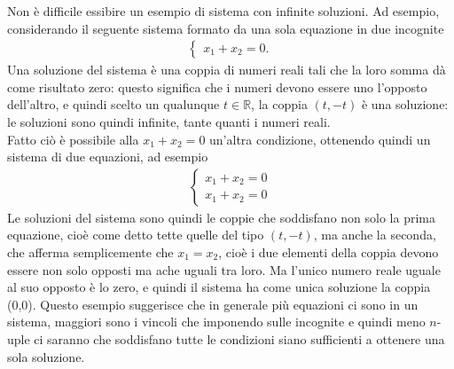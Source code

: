 \begin{defi}
  Non è difficile essibire un esempio di sistema con infinite soluzioni.
  Ad esempio, considerando il seguente sistema formato da una sola
  equazione in due incognite
  \begin{eqnarray*}
    \begin{cases}
      x_1+x_2=0.
    \end{cases} 
  \end{eqnarray*}
  Una soluzione del sistema è una coppia di numeri reali tali che la
  loro somma dà come risultato zero: questo significa che i numeri
  devono essere uno l'opposto dell'altro, e quindi scelto un qualunque
  $t\in \mathds{R}$, la coppia $(t,-t)$ è una soluzione: le soluzioni
  sono quindi infinite, tante quanti i numeri reali.\\
  Fatto ciò è possibile alla $x_1+x_2=0$ un'altra condizione, ottenendo
  quindi un sistema di due equazioni, ad esempio
  \begin{eqnarray}
    \label{eq:eqlinematrici3}
    \begin{cases}
      x_1+x_2=0 \\
      x_1+x_2=0
    \end{cases} 
  \end{eqnarray}
  Le soluzioni del sistema sono quindi le coppie che soddisfano non solo
  la prima equazione, cioè come detto tette quelle del tipo $(t,-t)$, ma
  anche la seconda, che afferma semplicemente che $x_1=x_2$, cioè i due
  elementi della coppia devono essere non solo opposti ma ache uguali tra
  loro. Ma l'unico numero reale uguale al suo opposto è lo zero, e quindi
  il sistema ha come unica soluzione la coppia (0,0). Questo esempio
  suggerisce che in generale più equazioni ci sono in un sistema,
  maggiori sono i vincoli che imponendo sulle incognite e quindi meno
  $n$-uple ci saranno che soddisfano tutte le condizioni siano sufficienti
  a ottenere una sola soluzione.


\end{defi}
